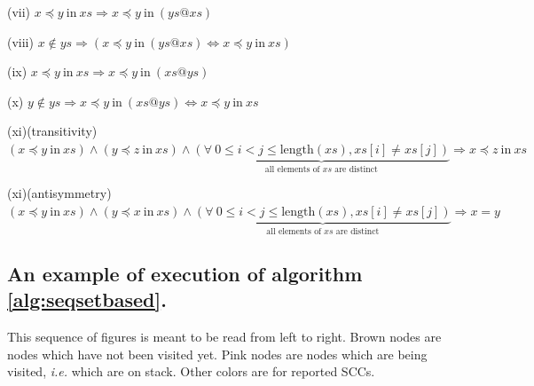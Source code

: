 \documentclass[a4 paper, 12pt]{article}
\begin{document}
{\begin{flushleft}
    (vii)
    $x \preceq y~\text{in}~xs \Longrightarrow x \preceq y~\text{in}~(ys @ xs)$
\end{flushleft}

\begin{flushleft}
    (viii)
    $x \notin ys \Longrightarrow (x \preceq y~\text{in}~(ys @ xs) \Longleftrightarrow x \preceq y~\text{in}~xs)$
\end{flushleft}

\begin{flushleft}
    (ix)
    $x \preceq y~\text{in}~xs \Longrightarrow x \preceq y~\text{in}~(xs @ ys)$
\end{flushleft}

\begin{flushleft}
    (x)
    $y \notin ys \Longrightarrow x \preceq y~\text{in}~(xs @ ys) \Longleftrightarrow x \preceq y~\text{in}~xs$
\end{flushleft}

\begin{flushleft}
    (xi)(transitivity)
    $(x \preceq y~\text{in}~xs) \wedge (y \preceq z~\text{in}~xs) \wedge \underset{\text{all elements of $xs$ are distinct}}{\underbrace{(\forall~0 \leq i < j \leq \text{length}(xs), xs[i] \neq xs[j])}} \Longrightarrow x \preceq z~\text{in}~xs$
\end{flushleft}

\begin{flushleft}
    (xi)(antisymmetry)
    $(x \preceq y~\text{in}~xs) \wedge (y \preceq x~\text{in}~xs) \wedge \underset{\text{all elements of $xs$ are distinct}}{\underbrace{(\forall~0 \leq i < j \leq \text{length}(xs), xs[i] \neq xs[j])}} \Longrightarrow x = y$
\end{flushleft}

\subsection{An example of execution of algorithm \ref{alg:seqsetbased}.}\label{appendix:exec_ex}
This sequence of figures is meant to be read from left to right. Brown nodes are nodes which have not been visited yet. Pink nodes are nodes which are being visited, \textit{i.e.} which are on stack. Other colors are for reported SCCs.

}
\end{document}

